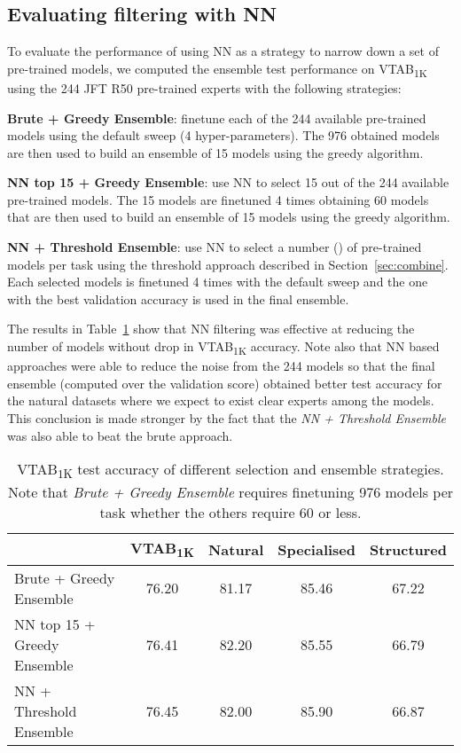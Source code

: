 \documentclass{article} \usepackage{iclr2021_conference,times}
\begin{document}
\subsection{Evaluating filtering with \texorpdfstring{NN}{kNN}}
\label{app:knn-headroom}


To evaluate the performance of using NN as a strategy to narrow down a set of pre-trained models, we computed the ensemble test performance on VTAB\textsubscript{1K} using the 244 JFT R50 pre-trained experts with the following strategies:

\textbf{Brute + Greedy Ensemble}: finetune each of the 244 available pre-trained models using the default sweep (4 hyper-parameters). The 976 obtained models are then used to build an ensemble of 15 models using the greedy algorithm.

\textbf{NN top 15 + Greedy Ensemble}: use NN to select 15 out of the 244 available  pre-trained models. The 15 models are finetuned 4 times obtaining 60 models that are then used to build an ensemble of 15 models using the greedy algorithm.

\textbf{NN + Threshold Ensemble}: use NN to select a number () of pre-trained models per task using the threshold approach described in Section~\ref{sec:combine}. Each selected models is finetuned 4 times with the default sweep and the one with the best validation accuracy is used in the final ensemble.



The results in Table~\ref{tab:knn-headroom} show that NN filtering was effective at reducing the number of models without drop in VTAB\textsubscript{1K} accuracy. Note also that NN based approaches were able to reduce the noise from the 244 models so that the final ensemble (computed over the validation score) obtained better test accuracy for the natural datasets where we expect to exist clear experts among the models. This conclusion is made stronger by the fact that the \emph{NN + Threshold Ensemble} was also able to beat the brute approach.

\begin{table}[!htb]
\centering
\begin{tabular}{@{}l|c|ccc@{}}
\toprule
                             & VTAB\textsubscript{1K}  & Natural & Specialised & Structured \\ \midrule
Brute + Greedy Ensemble      & 76.20  &  81.17  &  85.46  &  67.22     \\
NN top 15 + Greedy Ensemble  & 76.41  &  82.20  &  85.55  &  66.79     \\ 
NN + Threshold Ensemble         & 76.45  &  82.00  &  85.90  &  66.87     \\ \bottomrule
\end{tabular}
\caption{VTAB\textsubscript{1K} test accuracy of different selection and ensemble strategies. Note that \emph{Brute + Greedy Ensemble} requires finetuning 976 models per task whether the others require 60 or less.}
\label{tab:knn-headroom}
\end{table}
\end{document}
